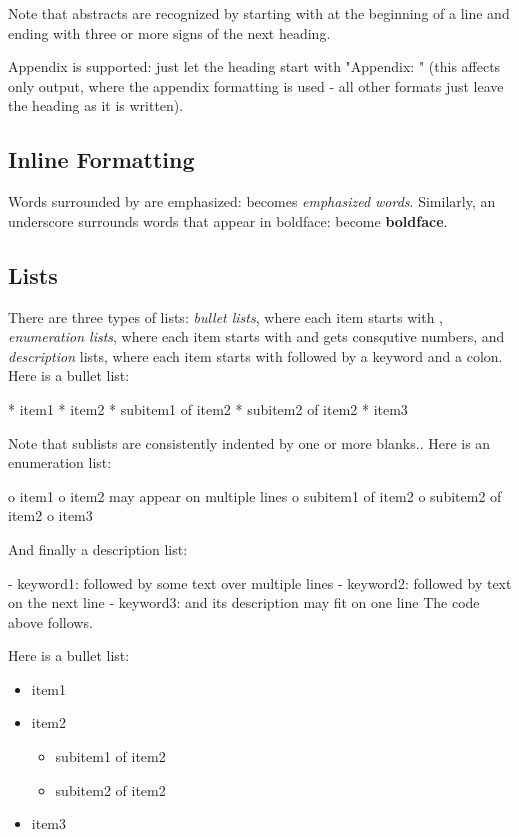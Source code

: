 \documentclass[%
oneside,                 %
final,                   %
chapterprefix=true,      %
open=right               %
10pt]{book}
\begin{document}
\noindent
Note that abstracts are recognized by starting with  at
the beginning of a line and ending with three or more \code{=} signs of the
next heading.

Appendix is supported: just let the heading start with "Appendix: "
(this affects only  output, where the appendix formatting
is used - all other formats just leave the heading as it is written).

\subsection{Inline Formatting}

Words surrounded by \code{*} are emphasized:  becomes
\emph{emphasized words}. Similarly, an underscore surrounds words that
appear in boldface:  become \textbf{boldface}.

\subsection{Lists}

There are three types of lists: \emph{bullet lists}, where each item starts
with \code{*}, \emph{enumeration lists}, where each item starts with  and gets
consqutive numbers,
and \emph{description} lists, where each item starts with \code{-} followed
by a keyword and a colon.
\bccq
Here is a bullet list:

 * item1
 * item2
  * subitem1 of item2
  * subitem2 of item2
 * item3

Note that sublists are consistently indented by one or more blanks..
Here is an enumeration list:

 o item1
 o item2
   may appear on
   multiple lines
  o subitem1 of item2
  o subitem2 of item2
 o item3

And finally a description list:

 - keyword1: followed by
   some text
   over multiple
   lines
 - keyword2:
   followed by text on the next line
 - keyword3: and its description may fit on one line
\eccq
The code above follows.

Here is a bullet list:

\begin{itemize}
 \item item1

 \item item2
\begin{itemize}

  \item subitem1 of item2

  \item subitem2 of item2

\end{itemize}

\noindent
 \item item3
\end{itemize}
\end{document}
